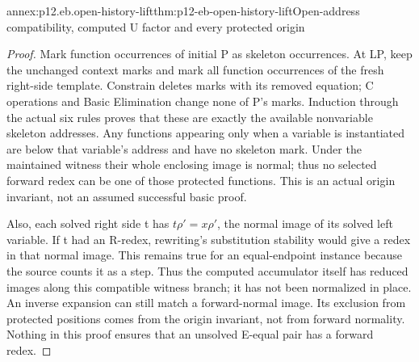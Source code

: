 \begin{annexitem}{annex:p12.eb.open-history-lift}{thm:p12-eb-open-history-lift}{Open-address compatibility, computed U factor and every protected origin}
\begin{proof}
Mark function occurrences of initial P as skeleton occurrences.
At LP, keep the unchanged context marks and mark all function
occurrences of the fresh right-side template. Constrain deletes
marks with its removed equation; C operations and Basic
Elimination change none of P's marks. Induction through the
actual six rules proves that these are exactly the available
nonvariable skeleton addresses. Any functions appearing only
when a variable is instantiated are below that variable's
address and have no skeleton mark. Under the maintained witness
their whole enclosing image is normal; thus no selected forward
redex can be one of those protected functions. This is an
actual origin invariant, not an assumed successful basic proof.

Also, each solved right side t has
\(t\rho'=x\rho'\), the normal image of its solved left
variable. If t had an R-redex, rewriting's substitution stability
would give a redex in that normal image. This remains true for
an equal-endpoint instance because the source counts it as a
step. Thus the computed accumulator itself has reduced images
along this compatible witness branch; it has not been normalized
in place. An inverse expansion can still match a forward-normal
image. Its exclusion from protected positions comes from the
origin invariant, not from forward normality. Nothing in this
proof ensures that an unsolved E-equal pair has a forward redex.
\end{proof}
\end{annexitem}

